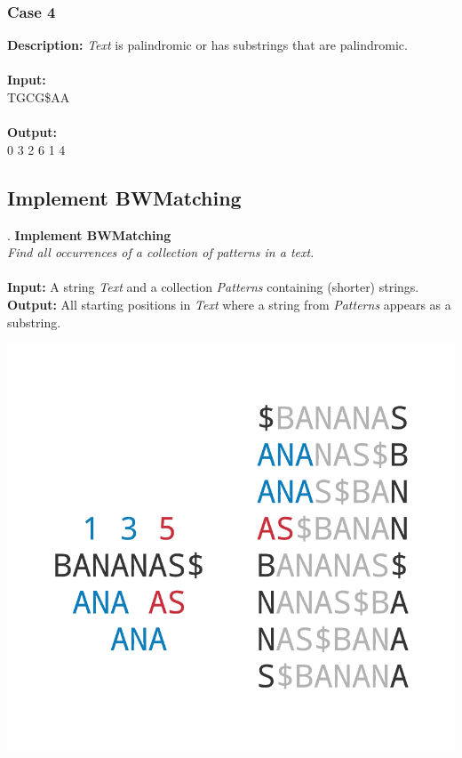 \documentclass{article}
\newcommand{\code}[1]{{\fontfamily{pcr}\selectfont #1}}
\begin{document}
\subsubsection*{Case 4}
\hline \vspace{5}
\textbf{Description:} \emph{Text} is palindromic or has substrings that are palindromic.\\ \\
\noindent \textbf{Input:}\\
\code{TGCG\$AA}\\ \\
\noindent \textbf{Output:}\\
\code{5 0 3 2 6 1 4}
\pagebreak
\subsection{Implement BWMatching}.
\hline\vspace{5}
\noindent\textbf{Implement BWMatching}\\
\emph{Find all occurrences of a collection of patterns in a text.}\\ \\
\textbf{Input:} A string \emph{Text} and a collection \emph{Patterns} containing (shorter) strings. \\
\textbf{Output:} All starting positions in \emph{Text} where a string from \emph{Patterns} appears as a substring.
\begin{center}
    \includegraphics[scale=0.2]{logos/9LMN.png} 
\end{center}
\hline\vspace{5}
\end{document}
